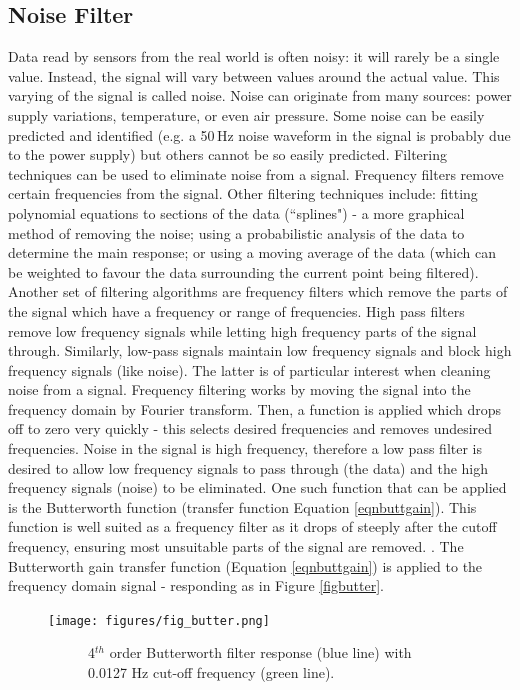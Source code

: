 \documentclass[twoside,a4]{report}
\def\br{\newline \newline \noindent}
\begin{document}
	\subsection*{Noise Filter}
	Data read by sensors from the real world is often noisy: it will rarely be a single value. Instead, the signal will vary between values around the actual value. This varying of the signal is called noise. Noise can originate from many sources: power supply variations, temperature, or even air pressure. Some noise can be easily predicted and identified (e.g. a 50\,Hz noise waveform in the signal is probably due to the power supply) but others cannot be so easily predicted. 
	\br
	Filtering techniques can be used to eliminate noise from a signal. Frequency filters remove certain frequencies from the signal. Other filtering techniques include: fitting polynomial equations to sections of the data (``splines") - a more graphical method of removing the noise; using a probabilistic analysis of the data to determine the main response; or using a moving average of the data (which can be weighted to favour the data surrounding the current point being filtered).
	\br
	Another set of filtering algorithms are frequency filters which remove the parts of the signal which have a frequency or range of frequencies. High pass filters remove low frequency signals while letting high frequency parts of the signal through. Similarly, low-pass signals maintain low frequency signals and block high frequency signals (like noise). The latter is of particular interest when cleaning noise from a signal. Frequency filtering works by moving the signal into the frequency domain by Fourier transform. Then, a function is applied which drops off to zero very quickly - this selects desired frequencies and removes undesired frequencies. Noise in the signal is high frequency, therefore a low pass filter is desired to allow low frequency signals to pass through (the data) and the high frequency signals (noise) to be eliminated. One such function that can be applied is the Butterworth function (transfer function Equation \ref{eqnbuttgain}). This function is well suited as a frequency filter as it drops of steeply after the cutoff frequency, ensuring most unsuitable parts of the signal are removed. \cite{backsignalbutter}. The Butterworth gain transfer function (Equation \ref{eqnbuttgain}) is applied to the frequency domain signal - responding as in Figure \ref{figbutter}.
	
	\begin{figure}[!htb]
		\centering
		\texttt{[image: figures/fig\_butter.png]}
		\caption{Frequency Domain Signal Response To Butterworth Function}
		\label{figbutter}
		\begin{subfigure}{0.8\textwidth}
			\centering
			{\footnotesize 4$^{th}$ order Butterworth filter response (blue line) with 0.0127 Hz cut-off frequency (green line).}
		\end{subfigure}
	\end{figure}
	
\end{document}
